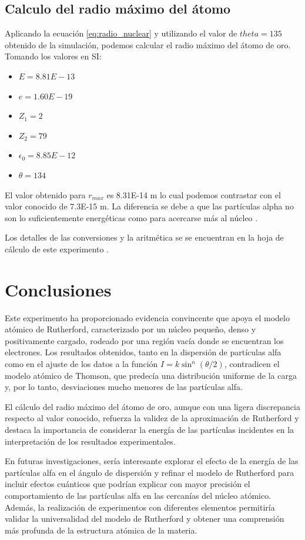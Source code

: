 \documentclass[twocolumn,a4paper,11pt]{scrartcl}
\begin{document}
\subsection*{Calculo del radio máximo del átomo}
Aplicando la ecuación \ref{eq:radio_nuclear} y utilizando el valor de $theta=135$ obtenido de la simulación, podemos calcular el radio máximo del átomo de oro.
Tomando los valores en SI:
\begin{itemize}
  \item $E=8.81E-13$
  \item $e=1.60E-19$
  \item $Z_1=2$
  \item $Z_2=79$
  \item $\epsilon_0=8.85E-12$
  \item $\theta = 134$
\end{itemize}

El valor obtenido para $r_{max}$ es 8.31E-14 m lo cual podemos contrastar con el valor conocido de 7.3E-15 m. La diferencia se debe a que las partículas alpha no son lo suficientemente energéticas como para acercarse más al núcleo \cite{Wikipedia_Rutherford}.

Los detalles de las conversiones y la aritmética se se encuentran en la hoja de cálculo de este experimento \cite{HojaCalculo}.


\section{Conclusiones}
Este experimento ha proporcionado evidencia convincente que apoya el modelo atómico de Rutherford, caracterizado por un núcleo pequeño, denso y positivamente cargado, rodeado por una región vacía donde se encuentran los electrones. Los resultados obtenidos, tanto en la dispersión de partículas alfa como en el ajuste de los datos a la función $I = k \sin^n (\theta/2)$, contradicen el modelo atómico de Thomson, que predecía una distribución uniforme de la carga y, por lo tanto, desviaciones mucho menores de las partículas alfa.

El cálculo del radio máximo del átomo de oro, aunque con una ligera discrepancia respecto al valor conocido, refuerza la validez de la aproximación de Rutherford y destaca la importancia de considerar la energía de las partículas incidentes en la interpretación de los resultados experimentales.

En futuras investigaciones, sería interesante explorar el efecto de la energía de las partículas alfa en el ángulo de dispersión y refinar el modelo de Rutherford para incluir efectos cuánticos que podrían explicar con mayor precisión el comportamiento de las partículas alfa en las cercanías del núcleo atómico. Además, la realización de experimentos con diferentes elementos permitiría validar la universalidad del modelo de Rutherford y obtener una comprensión más profunda de la estructura atómica de la materia.



\end{document}
